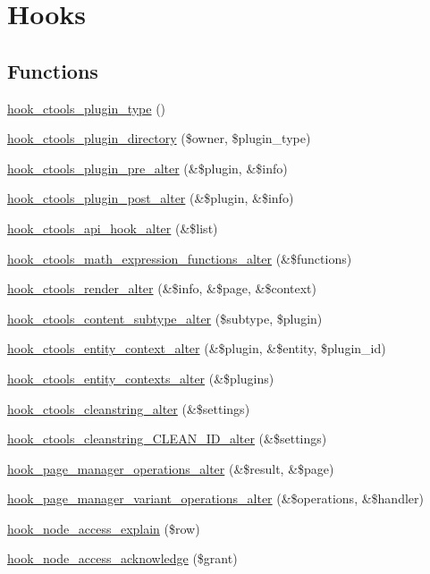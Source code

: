 \hypertarget{group__hooks}{
\section{Hooks}
\label{group__hooks}
}
\subsection*{Functions}
\begin{DoxyCompactItemize}
\item 
\hyperlink{group__hooks_gacb27d27849a3374ddda0120603d549ac}{hook\_\-ctools\_\-plugin\_\-type} ()
\item 
\hyperlink{group__hooks_gaf17a0de7a7ca6e6c30c766ea1e44715e}{hook\_\-ctools\_\-plugin\_\-directory} (\$owner, \$plugin\_\-type)
\item 
\hyperlink{group__hooks_ga4ae530d112605c111f7bdead789ed91d}{hook\_\-ctools\_\-plugin\_\-pre\_\-alter} (\&\$plugin, \&\$info)
\item 
\hyperlink{group__hooks_ga2f8a7bad70a9bcb0748a13463a32d362}{hook\_\-ctools\_\-plugin\_\-post\_\-alter} (\&\$plugin, \&\$info)
\item 
\hyperlink{group__hooks_gad31fa7973a09a182d52fc1bda3bd95a0}{hook\_\-ctools\_\-api\_\-hook\_\-alter} (\&\$list)
\item 
\hyperlink{group__hooks_ga133fb5b53380291a3348feffb3dd3364}{hook\_\-ctools\_\-math\_\-expression\_\-functions\_\-alter} (\&\$functions)
\item 
\hyperlink{group__hooks_ga512e53c159fc6ea771d23b52d54b2f6a}{hook\_\-ctools\_\-render\_\-alter} (\&\$info, \&\$page, \&\$context)
\item 
\hyperlink{group__hooks_ga095e4e5a15a03861b5e708e3454bf154}{hook\_\-ctools\_\-content\_\-subtype\_\-alter} (\$subtype, \$plugin)
\item 
\hyperlink{group__hooks_gad8e0232b98d84d2347a3cc1e26c3df09}{hook\_\-ctools\_\-entity\_\-context\_\-alter} (\&\$plugin, \&\$entity, \$plugin\_\-id)
\item 
\hyperlink{group__hooks_gadc7f17dbf80ddbe90f66e7e9a0abb350}{hook\_\-ctools\_\-entity\_\-contexts\_\-alter} (\&\$plugins)
\item 
\hyperlink{group__hooks_ga8904abb33205b8553b560e08fd005e3a}{hook\_\-ctools\_\-cleanstring\_\-alter} (\&\$settings)
\item 
\hyperlink{group__hooks_gaa77de664d1ef915311e4f768eb6c62ea}{hook\_\-ctools\_\-cleanstring\_\-CLEAN\_\-ID\_\-alter} (\&\$settings)
\item 
\hyperlink{group__hooks_gadade57abdccc892f62ed6bc7f089ca29}{hook\_\-page\_\-manager\_\-operations\_\-alter} (\&\$result, \&\$page)
\item 
\hyperlink{group__hooks_gaf5d4ce054cae22b3bdca52011c6e8fbc}{hook\_\-page\_\-manager\_\-variant\_\-operations\_\-alter} (\&\$operations, \&\$handler)
\item 
\hyperlink{group__hooks_gaeedf3adea0813fb3631f26d0de83a68d}{hook\_\-node\_\-access\_\-explain} (\$row)
\item 
\hyperlink{group__hooks_gac5a197ac3564b867c2921fb496063ae6}{hook\_\-node\_\-access\_\-acknowledge} (\$grant)
\end{DoxyCompactItemize}


